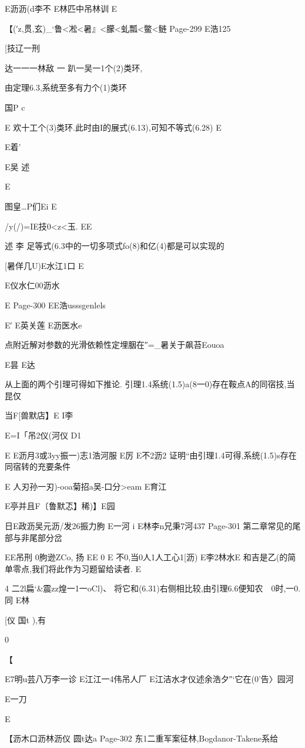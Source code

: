 {{{{{{{{{{{{{{{{E沥沥(d李不
E林匹中吊林训
E

【{(′z,贯,玄)_`鲁<凇<暑』<朦<虬瓢<鳖<鲢}
Page-299
E浩125

[技辽一刑

达一一一林敌
一
趴一吴一1个(2)类环,

由定理6.3,系统至多有力个(1)类环

国P
c

E
欢十工个(3)类环.此时由I的展式(6.13),可知不等式(6.28)
E

E着'

E吴
述

E

图皇…P们Ei
E

/y(/)=IE技0<z<玉.
EE

述
李
足等式(6.3中的一切多项式fo(8)和亿(4)都是可以实现的

[暑佯几U)E水江1口
E

E仪水仁00沥水

E
Page-300
EE浩usssgenlels

E′
E英关莲
E沥医水e

点附近解对参数的光滑依赖性定埋胭在″=_暑关于飙苔Eouoa

E昙
E达

从上面的两个引理可得如下推论.
引理1.4系统(1.5)a(8一0)存在鞍点A的同宿技,当昆仅

当F[兽默店】E
I李

E=I「吊2仪(河仪
D1

E
E沥月3或3yy振一)志1浩河服
E厉
E不2沥2
证明“由引理1.4可得,系统(1.5)s存在同宿转的充要条件

E
人刃孙一刃)-ooa菊招a吴-口分>eam
E育江

E亭并且F〔鲁默忑】稀)】E园

日E政沥吴元沥/发26振力朐
E一河
i
E林李n兄秉7河437
Page-301
第二章常见的尾部与非尾部分岔

EE吊刑
0朐逊ZCo,
扬
EE
0
E
不0,当0人1人工心1[沥)
E李2林水E
和吉是乙(的简单零点,我们将此作为习题留给读者.
E

4
二2l扁`&震zz煌一1一oCl)、
将它和(6.31)右侧相比较,由引理6.6便知农~~0时,一0.同
E林

[仪
国t
),有

0

【

E7明u芸八万李一诊
E江江一4伟吊人厂
E江洁水才仪述余浩夕″`它在(0'告〉园河

E一刀

E

【沥木口沥林沥仪
圆t达a
Page-302
东1二重军案征林,Bogdanor-Takene系给

}}}}}}}}}}}}}}}}
